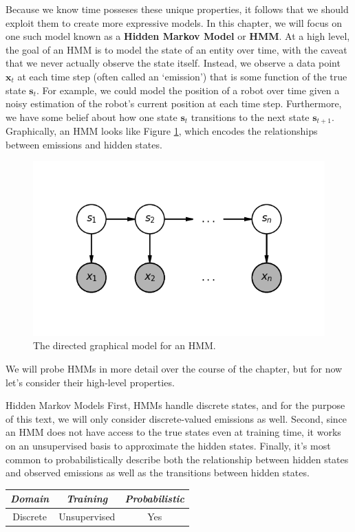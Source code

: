 Because we know time posseses these unique properties, it follows that we should exploit them to create more expressive models. In this chapter, we will focus on one such model known as a \textbf{Hidden Markov Model} or \textbf{HMM}. At a high level, the goal of an HMM is to model the state of an entity over time, with the caveat that we never actually observe the state itself. Instead, we observe a data point $\textbf{x}_t$ at each time step (often called an `emission') that is some function of the true state $\textbf{s}_t$. For example, we could model the position of a robot over time given a noisy estimation of the robot's current position at each time step. Furthermore, we have some belief about how one state $\textbf{s}_t$ transitions to the next state $\textbf{s}_{t+1}$. Graphically, an HMM looks like Figure \ref{fig:HMM-DGM}, which encodes the relationships between emissions and hidden states.

\begin{figure}
    \centering
    \includegraphics[width=0.5\paperwidth]{../HiddenMarkovModels/fig/HMM_DGM.png}
    \caption{The directed graphical model for an HMM.}
    \label{fig:HMM-DGM}
\end{figure}

We will probe HMMs in more detail over the course of the chapter, but for now let's consider their high-level properties.

\begin{mlcube}{Hidden Markov Models}
First, HMMs handle discrete states, and for the purpose of this text, we will only consider discrete-valued emissions as well. Second, since an HMM does not have access to the true states even at training time, it works on an unsupervised basis to approximate the hidden states. Finally, it's most common to probabilistically describe both the relationship between hidden states and observed emissions as well as the transitions between hidden states.
\begin{center}
    \begin{tabular}{c|c|c}
    \textit{\textbf{Domain}} & \textit{\textbf{Training}} & \textit{\textbf{Probabilistic}} \\
    \hline
    Discrete & Unsupervised & Yes \\
    \end{tabular}
\end{center}
\end{mlcube}

